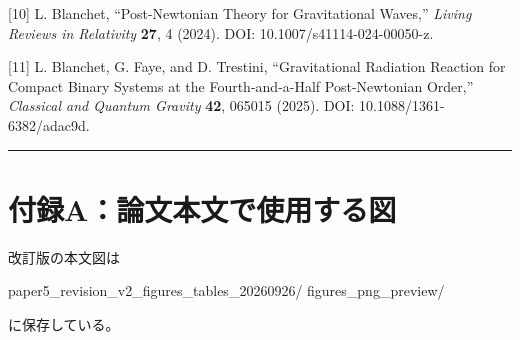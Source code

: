 \documentclass[
  a4paper,
]{ltjsarticle}
\newenvironment{Shaded}{}{}
\newcommand{\NormalTok}[1]{#1}
\begin{document}
{[}10{]} L. Blanchet, ``Post-Newtonian Theory for Gravitational Waves,''
\emph{Living Reviews in Relativity} \textbf{27}, 4 (2024). DOI:
10.1007/s41114-024-00050-z.

{[}11{]} L. Blanchet, G. Faye, and D. Trestini, ``Gravitational
Radiation Reaction for Compact Binary Systems at the Fourth-and-a-Half
Post-Newtonian Order,'' \emph{Classical and Quantum Gravity}
\textbf{42}, 065015 (2025). DOI: 10.1088/1361-6382/adac9d.

\begin{center}\rule{0.5\linewidth}{0.5pt}\end{center}

\section{付録A：論文本文で使用する図}\label{ux4ed8ux9332aux8ad6ux6587ux672cux6587ux3067ux4f7fux7528ux3059ux308bux56f3}

改訂版の本文図は

\begin{Shaded}
\begin{Highlighting}[]
\NormalTok{paper5\_revision\_v2\_figures\_tables\_20260926/}
\NormalTok{figures\_png\_preview/}
\end{Highlighting}
\end{Shaded}

に保存している。
\end{document}
